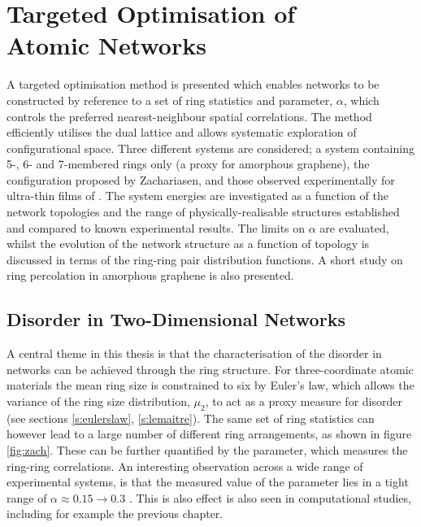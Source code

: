 \chapter[Targeted Optimisation of Atomic Networks]{Targeted Optimisation of \\ Atomic Networks}
\label{ch:targetedopt}

\begin{chapterabstract}
A targeted optimisation method is presented which enables \td{} networks to be constructed by reference to a set of ring statistics and \aw{} parameter, $\alpha$, which controls the preferred nearest\--neighbour spatial correlations.
The method efficiently utilises the dual lattice and allows systematic exploration of configurational space. 
Three different systems are considered; a system containing 5\--, 6\-- and 7\--membered rings only (a proxy for amorphous graphene), the configuration proposed by Zachariasen, and those
observed experimentally for ultra\--thin films of \sioii. 
The system energies are investigated as a function of the network topologies and the range of physically\--realisable structures established and compared to known experimental results.
The limits on $\alpha$ are evaluated, whilst the evolution of the network structure as a function of topology is discussed in terms of the ring\--ring pair distribution functions.
A short study on ring percolation in amorphous graphene is also presented.
\end{chapterabstract}


\section{Disorder in Two\--Dimensional Networks}

A central theme in this thesis is that the characterisation of the disorder in \td{} networks can be achieved through the ring structure. 
For three\--coordinate atomic materials the mean ring size is constrained to six by Euler's law, which allows the variance of the ring size distribution, $\mu_2$, to act as a proxy measure for disorder (see sections \ref{s:eulerslaw}, \ref{s:lemaitre}).
The same set of ring statistics can however lead to a large number of different ring arrangements, as shown in figure \ref{fig:zach}.
These can be further quantified by the \aw{} parameter, which measures the ring\--ring correlations.
An interesting observation across a wide range of experimental systems, is that the measured value of the \aw{} parameter lies in a tight range of $\alpha\approx0.15\rightarrow 0.3$ \cite{Zsoldos1999}.
This is also effect is also seen in computational studies, including for example the previous chapter.

